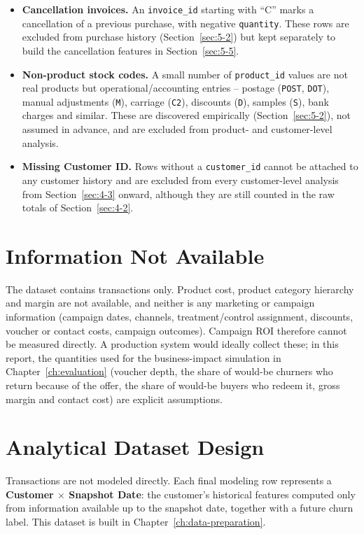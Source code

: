 \begin{itemize}
    \item \textbf{Cancellation invoices.} An \texttt{invoice\_id} starting with ``C'' marks a cancellation of a previous purchase, with negative \texttt{quantity}. These rows are excluded from purchase history (Section~\ref{sec:5-2}) but kept separately to build the cancellation features in Section~\ref{sec:5-5}.
    \item \textbf{Non-product stock codes.} A small number of \texttt{product\_id} values are not real products but operational/accounting entries -- postage (\texttt{POST}, \texttt{DOT}), manual adjustments (\texttt{M}), carriage (\texttt{C2}), discounts (\texttt{D}), samples (\texttt{S}), bank charges and similar. These are discovered empirically (Section~\ref{sec:5-2}), not assumed in advance, and are excluded from product- and customer-level analysis.
    \item \textbf{Missing Customer ID.} Rows without a \texttt{customer\_id} cannot be attached to any customer history and are excluded from every customer-level analysis from Section~\ref{sec:4-3} onward, although they are still counted in the raw totals of Section~\ref{sec:4-2}.
\end{itemize}

\section{Information Not Available}
\label{sec:3-6}

The dataset contains transactions only. Product cost, product category hierarchy and margin are not available, and neither is any marketing or campaign information (campaign dates, channels, treatment/control assignment, discounts, voucher or contact costs, campaign outcomes). Campaign ROI therefore cannot be measured directly. A production system would ideally collect these; in this report, the quantities used for the business-impact simulation in Chapter~\ref{ch:evaluation} (voucher depth, the share of would-be churners who return because of the offer, the share of would-be buyers who redeem it, gross margin and contact cost) are explicit assumptions.

\section{Analytical Dataset Design}
\label{sec:3-7}

Transactions are not modeled directly. Each final modeling row represents a \textbf{Customer $\times$ Snapshot Date}: the customer's historical features computed only from information available up to the snapshot date, together with a future churn label. This dataset is built in Chapter~\ref{ch:data-preparation}.
